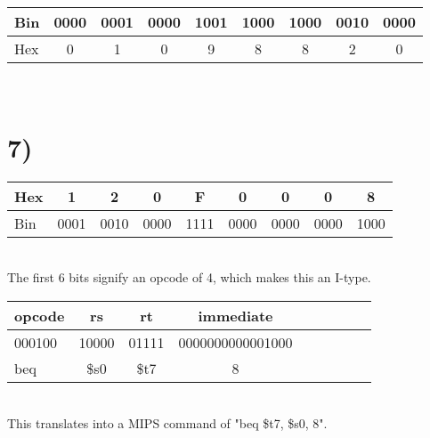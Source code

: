 \documentclass[a4paper,11pt]{article}
\begin{document}
\noindent \begin{tabular}{| l | c | c | c | c | c | c | c | c |}
  \hline	
  Bin & 0000 & 0001 & 0000 & 1001 & 1000 & 1000 & 0010 & 0000 \\ \hline
  Hex & 0 & 1 & 0 & 9 & 8 & 8 & 2 & 0 \\  \hline  		
\end{tabular} \\


\section*{7)}
\begin{tabular}{| l | c | c | c | c | c | c | c | c |}
  \hline	
  Hex & 1 & 2 & 0 & F & 0 & 0 & 0 & 8 \\  \hline  		
  Bin & 0001 & 0010 & 0000 & 1111 & 0000 & 0000 & 0000 & 1000 \\ \hline
\end{tabular} \\

\noindent The first 6 bits signify an opcode of 4, which makes this an I-type.  \\

\noindent \begin{tabular}{| l | c | c | c | c | c | c | c | c |}
  \hline	
  opcode & rs & rt & immediate  \\  \hline  		
  000100 & 10000 & 01111 & 0000000000001000  \\ \hline
  beq & \$s0 & \$t7 & 8  \\ \hline
\end{tabular} \\

\noindent This translates into a MIPS command of "beq \$t7, \$s0, 8".

\end{document}
